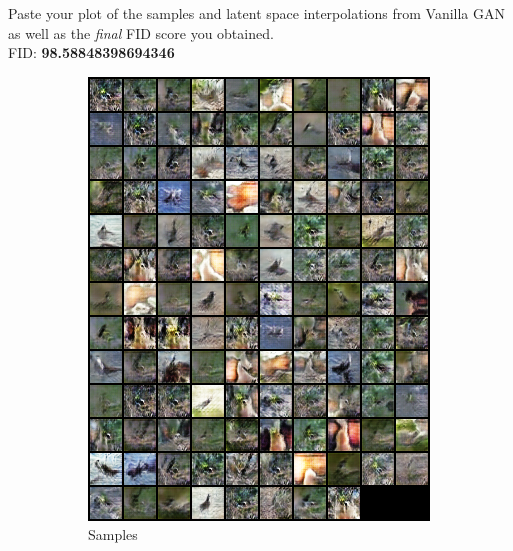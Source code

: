 \documentclass[11pt,addpoints,answers]{exam}
\numberwithin{equation}{section} %
\numberwithin{figure}{section} %
\numberwithin{table}{section} %
\begin{document}
\begin{questions}
\question Paste your plot of the samples and latent space interpolations from Vanilla GAN as well as the \textit{final} FID score you obtained. 
\\
FID: \textbf{98.58848398694346} 
\begin{figure}[H]
    \centering
    \begin{subfigure}[b]{0.32\linewidth}
        \includegraphics[width=\linewidth]{1.3_samples.png}
        \caption{Samples}
    \end{subfigure}
    \begin{subfigure}[b]{0.32\linewidth}

\end{subfigure}
\end{figure}
\end{questions}
\end{document}
